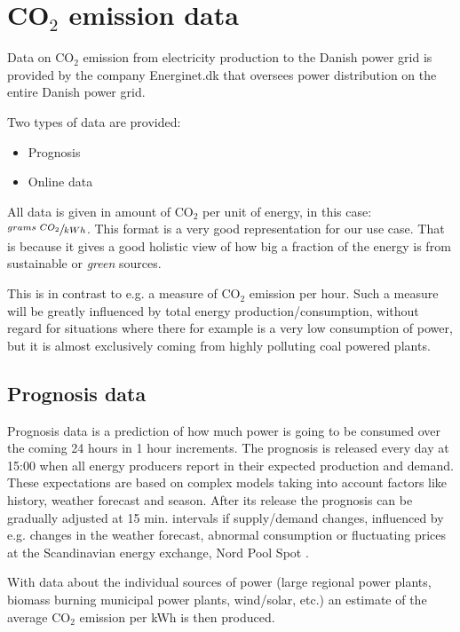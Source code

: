 \documentclass[Main]{subfiles}
\begin{document}
\section{CO$_2$ emission data} %
\label{sub:c02_emission_data}

	Data on CO$_2$ emission from electricity production to the Danish power grid is provided by the company Energinet.dk that oversees power distribution on the entire Danish power grid.

	Two types of data are provided:
	\begin{itemize}
		\item Prognosis \cite{EnerginetFTPPrognosis:Online}
		\item Online data \cite{EnerginetFTPOnline:Online}
	\end{itemize}

	All data is given in amount of CO$_2$ per unit of energy, in this case: 
	$\sfrac{grams\ CO_2}{kWh}$.
	This format is a very good representation for our use case.
	That is because it gives a good holistic view of how big a fraction of the energy is from sustainable or \emph{green} sources.
	
	This is in contrast to e.g. a measure of CO$_2$ emission per hour.
	Such a measure will be greatly influenced by total energy production/consumption, without regard for situations where there for example is a very low consumption of power, but it is almost exclusively coming from highly polluting coal powered plants.

	\subsection{Prognosis data} %
	\label{sub:prognosis}
		Prognosis data is a prediction of how much power is going to be consumed over the coming 24 hours in 1 hour increments.
		The prognosis is released every day at 15:00 when all energy producers report in their expected production and demand.
		These expectations are based on complex models taking into account factors like history, weather forecast and season.
		After its release the prognosis can be gradually adjusted at 15 min. intervals if supply/demand changes, influenced by e.g. changes in the weather forecast, abnormal consumption or fluctuating prices at the Scandinavian energy exchange, Nord Pool Spot \cite{NordPool:Online}.

		With data about the individual sources of power (large regional power plants, biomass burning municipal power plants, wind/solar, etc.) an estimate of the average CO$_2$ emission per kWh is then produced.
\end{document}
